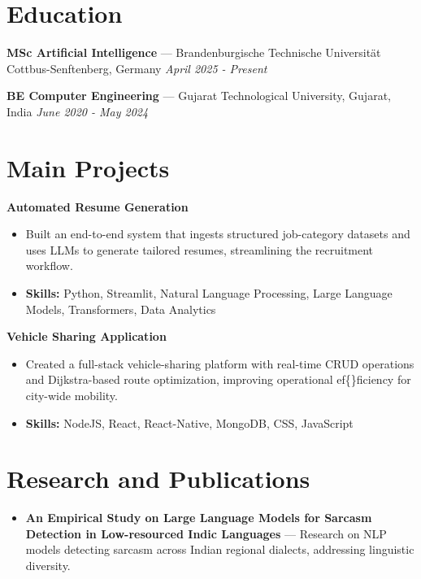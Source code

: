 \documentclass[a4paper,10pt]{article}
\begin{document}
\section*{Education}
\textbf{MSc Artificial Intelligence} — Brandenburgische Technische Universität Cottbus-Senftenberg, Germany \hfill \textit{April 2025 - Present}\par
\vspace{1.5pt}
\textbf{BE Computer Engineering} — Gujarat Technological University, Gujarat, India \hfill \textit{June 2020 - May 2024}\par

\section*{Main Projects}
\textbf{Automated Resume Generation}\par
\vspace{1pt}
\begin{itemize}
  \item Built an end-to-end system that ingests structured job-category datasets and uses LLMs to generate tailored resumes, streamlining the recruitment workflow.
  \item \textbf{Skills:} Python, Streamlit, Natural Language Processing, Large Language Models, Transformers, Data Analytics
\end{itemize}
\vspace{3pt}
\textbf{Vehicle Sharing Application}\par
\vspace{1pt}
\begin{itemize}
  \item Created a full-stack vehicle-sharing platform with real-time CRUD operations and Dijkstra-based route optimization, improving operational ef\{\}ficiency for city-wide mobility.
  \item \textbf{Skills:} NodeJS, React, React-Native, MongoDB, CSS, JavaScript
\end{itemize}

\section*{Research and Publications}
\begin{itemize}
\item \textbf{An Empirical Study on Large Language Models for Sarcasm Detection in Low-resourced Indic Languages} — Research on NLP models detecting sarcasm across Indian regional dialects, addressing linguistic diversity.
\end{itemize}
\end{document}
